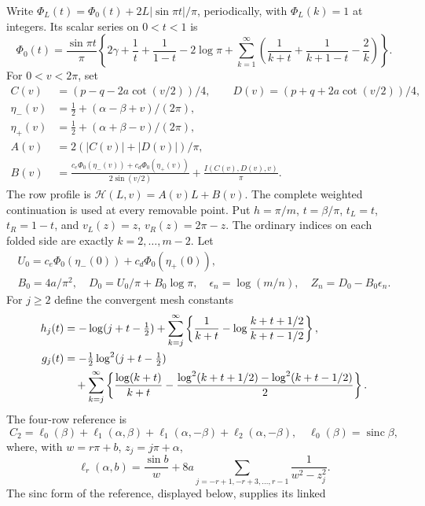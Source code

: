 Write $\Phi_L(t)=\Phi_0(t)+2L|\sin\pi t|/\pi$, periodically, with
$\Phi_L(k)=1$ at integers. Its scalar series on $0<t<1$ is
\begin{equation}\label{eq:Phi-series}
 \Phi_0(t)=\frac{\sin\pi t}{\pi}
 \left\{2\gamma+\frac1t+\frac1{1-t}-2\log\pi
       +\sum_{k=1}^\infty
        \left(\frac1{k+t}+\frac1{k+1-t}-\frac2k\right)\right\}.
\end{equation}
For $0<v<2\pi$, set
\begin{align*}
 C(v)&=(p-q-2a\cot(v/2))/4,\qquad
 D(v)=(p+q+2a\cot(v/2))/4,\\
 \eta_-(v)&=\tfrac12+(\alpha-\beta+v)/(2\pi),\\
 \eta_+(v)&=\tfrac12+(\alpha+\beta-v)/(2\pi),\\
 A(v)&=2(|C(v)|+|D(v)|)/\pi,\\
 B(v)&=\frac{c_e\Phi_0(\eta_-(v))+c_d\Phi_0(\eta_+(v))}
                   {2\sin(v/2)}+\frac{I(C(v),D(v),v)}\pi.
\end{align*}
The row profile is $\mathcal H(L,v)=A(v)L+B(v)$. The complete weighted
continuation is used at every removable point. Put $h=\pi/m$,
$t=\beta/\pi$, $t_L=t$, $t_R=1-t$, and $v_L(z)=z$, $v_R(z)=2\pi-z$.
The ordinary indices on each folded side are exactly $k=2,\ldots,m-2$.
Let
\begin{gather*}
 U_0=c_e\Phi_0(\eta_-(0))+c_d\Phi_0(\eta_+(0)),\\
 B_0=4a/\pi^2,\quad D_0=U_0/\pi+B_0\log\pi,
 \quad \epsilon_n=\log(m/n),\quad Z_n=D_0-B_0\epsilon_n.
\end{gather*}
For $j\geq2$ define the convergent mesh constants
\begin{align}\label{eq:hg-definitions}
 h_j(t)&=-\log(j+t-\tfrac12)+\sum_{k=j}^\infty
 \left\{\frac1{k+t}-\log\frac{k+t+1/2}{k+t-1/2}\right\},\\
 g_j(t)&=-\tfrac12\log^2(j+t-\tfrac12)\notag\\
 &\quad+\sum_{k=j}^\infty\left\{\frac{\log(k+t)}{k+t}
 -\frac{\log^2(k+t+1/2)-\log^2(k+t-1/2)}2\right\}.\notag
\end{align}
The four-row reference is
\begin{equation}\label{eq:C2-reference}
 C_2=\ell_0(\beta)+\ell_1(\alpha,\beta)
                  +\ell_1(\alpha,-\beta)+\ell_2(\alpha,-\beta),
 \quad \ell_0(\beta)=\operatorname{sinc}\beta,
\end{equation}
where, with $w=r\pi+b$, $z_j=j\pi+\alpha$,
\[
 \ell_r(\alpha,b)=\frac{\sin b}{w}
       +8a\sum_{j=-r+1,-r+3,\ldots,r-1}\frac1{w^2-z_j^2}.
\]
The sinc form of the reference, displayed below, supplies its linked
